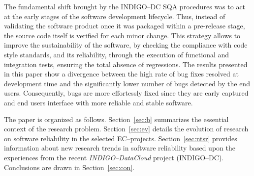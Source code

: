 The fundamental shift brought by the INDIGO--DC SQA procedures was 
to act at the early stages of the software development lifecycle. Thus, instead of validating the software product once 
it was packaged within a pre-release stage, the source code itself is verified for each minor change. This strategy 
allows to improve the sustainability of the software, by checking the compliance with code style standards, and its 
reliability, through the execution of functional and integration tests, ensuring the total absence of regressions. The results
presented in this paper show a divergence between the high rate of bug fixes resolved at development time and the 
significantly lower number of bugs detected by the end users. Consequently, bugs are more effortessly fixed since they 
are early captured and end users interface with more reliable and stable software.

The paper is organized as follows. Section~\ref{sec:b} summarizes the essential context of the research problem.
Section~\ref{sec:ev} details the evolution of research on software reliability in the selected EC--projects. 
Section~\ref{sec:ntsr} provides information about new research trends in software reliability based upon the
experiences from the recent {\sl INDIGO--DataCloud} project (INDIGO--DC). Conclusions are drawn in Section~\ref{sec:con}.


